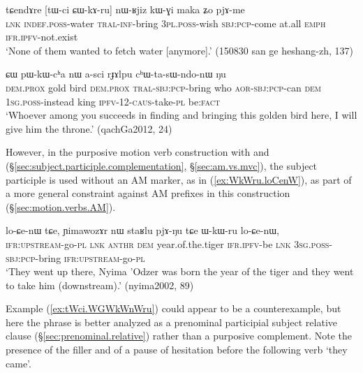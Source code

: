 \begin{exe}
\ex \label{ex:CWkAru.nWRjiz}
\gll  tɕendɤre [tɯ-ci ɕɯ-kɤ-ru] nɯ-ʁjiz kɯ-ɣi maka ʑo pjɤ-me \\
\textsc{lnk} \textsc{indef}.\textsc{poss}-water \textsc{tral}-\textsc{inf}-bring \textsc{3pl}.\textsc{poss}-wish \textsc{sbj}:\textsc{pcp}-come at.all \textsc{emph} \textsc{ifr}.\textsc{ipfv}-not.exist \\
\glt `None of them wanted to fetch water [anymore].' (150830 san ge heshang-zh, 137)
\end{exe}

\begin{exe}
\ex \label{ex:CWkWru.pWkWcha}
 ɕɯ pɯ-kɯ-cʰa nɯ a-sci rɟɤlpu cʰɯ-ta-sɯ-ndo-nɯ ŋu  \\
\textsc{dem}.\textsc{prox} gold bird \textsc{dem}.\textsc{prox} \textsc{tral}-\textsc{sbj}:\textsc{pcp}-bring who \textsc{aor}-\textsc{sbj}:\textsc{pcp}-can \textsc{dem} \textsc{1sg}.\textsc{poss}-instead king \textsc{ipfv}-1\fl{}2-\textsc{caus}-take-\textsc{pl} be:\textsc{fact} \\
\glt `Whoever among you succeeds in finding and bringing this golden bird here, I will give him the throne.' (qachGa2012, 24)
\end{exe}

 
However, in the purposive motion verb construction with  and  (§\ref{sec:subject.participle.complementation}, §\ref{sec:am.vs.mvc}), the subject participle  is used without an AM marker, as in (\ref{ex:WkWru.loCenW}), as part of a more general constraint against AM prefixes in this construction (§\ref{sec:motion.verbs.AM}).

\begin{exe}
\ex \label{ex:WkWru.loCenW}
\gll  lo-ɕe-nɯ tɕe,  ɲimawozɤr nɯ staʁlu pjɤ-ŋu tɕe ɯ-kɯ-ru lo-ɕe-nɯ,  \\
\textsc{ifr}:\textsc{upstream}-go-\textsc{pl} \textsc{lnk}  \textsc{anthr} \textsc{dem} year.of.the.tiger \textsc{ifr}.\textsc{ipfv}-be \textsc{lnk} \textsc{3sg}.\textsc{poss}-\textsc{sbj}:\textsc{pcp}-bring \textsc{ifr}:\textsc{upstream}-go-\textsc{pl} \\
\glt `They went up there, Nyima 'Odzer was born the year of the tiger and they went to take him (downstream).' (nyima2002, 89)
\end{exe}

Example (\ref{ex:tWci.WGWkWnWru}) could appear to be a counterexample, but here the phrase  is better analyzed as a prenominal participial subject relative clause (§\ref{sec:prenominal.relative}) rather than a purposive complement. Note the presence of the filler  and of a pause of hesitation before the following verb  `they came'.

